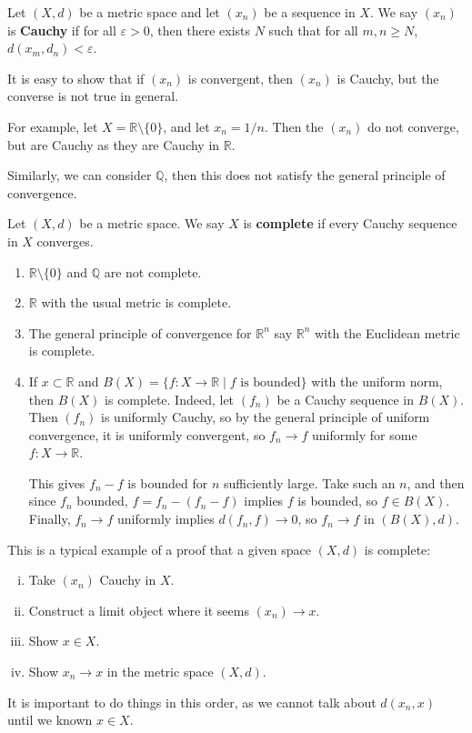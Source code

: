 \documentclass[12pt]{article}
\begin{document}
\begin{definition}
	Let $(X, d)$ be a metric space and let $(x_n)$ be a sequence in $X$. We say $(x_n)$ is \textbf{Cauchy} if for all $\varepsilon > 0$, then there exists $N$ such that for all $m, n \geq N$, $d(x_m, d_n) < \varepsilon$.
\end{definition}

It is easy to show that if $(x_n)$ is convergent, then $(x_n)$ is Cauchy, but the converse is not true in general.

For example, let $X = \mathbb{R} \setminus \{0\}$, and let $x_n = 1/n$. Then the $(x_n)$ do not converge, but are Cauchy as they are Cauchy in $\mathbb{R}$.

Similarly, we can consider $\mathbb{Q}$, then this does not satisfy the general principle of convergence.

\begin{definition}
	Let $(X, d)$ be a metric space. We say $X$ is \textbf{complete} if every Cauchy sequence in $X$ converges.
\end{definition}

\begin{exbox}
	\begin{enumerate}[1.]
		\item $\mathbb{R} \setminus \{0\}$ and $\mathbb{Q}$ are not complete.
		\item $\mathbb{R}$ with the usual metric is complete.
		\item The general principle of convergence for $\mathbb{R}^{n}$ say $\mathbb{R}^{n}$ with the Euclidean metric is complete.
		\item If $x \subset \mathbb{R}$ and $B(X) = \{f : X \to \mathbb{R} \mid f \text{ is bounded}\}$ with the uniform norm, then $B(X)$ is complete. Indeed, let $(f_n)$ be a Cauchy sequence in $B(X)$. Then $(f_n)$ is uniformly Cauchy, so by the general principle of uniform convergence, it is uniformly convergent, so $f_n \to f$ uniformly for some $f : X \to \mathbb{R}$.

			This gives $f_n - f$ is bounded for $n$ sufficiently large. Take such an $n$, and then since $f_n$ bounded, $f = f_n - (f_n - f)$ implies $f$ is bounded, so $f \in B(X)$. Finally, $f_n \to f$ uniformly implies $d(f_n, f) \to 0$, so $f_n \to f$ in $(B(X), d)$.
	\end{enumerate}
\end{exbox}

\begin{remark}
	This is a typical example of a proof that a given space $(X, d)$ is complete:
	\begin{enumerate}[(i)]
		\item Take $(x_n)$ Cauchy in $X$.
		\item Construct a limit object where it seems $(x_n) \to x$.
		\item Show $x \in X$.
		\item Show $x_n \to x$ in the metric space $(X, d)$.
	\end{enumerate}
	It is important to do things in this order, as we cannot talk about $d(x_n, x)$ until we known $x \in X$.
\end{remark}
\end{document}
